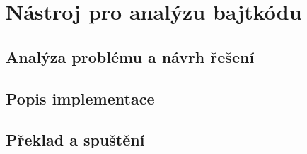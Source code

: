\chapter{Nástroj pro analýzu bajtkódu}\label{Tool}

\section{Analýza problému a návrh řešení}\label{ToolDesign}


\section{Popis implementace}\label{ToolImplementation}

\section{Překlad a spuštění}\label{ToolRun}

